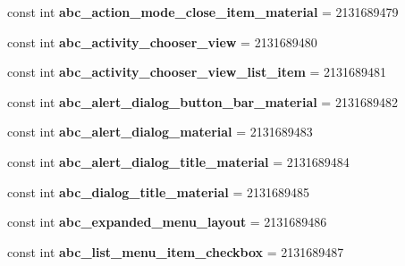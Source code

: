 \begin{DoxyCompactItemize}
const int {\bfseries abc\+\_\+action\+\_\+mode\+\_\+close\+\_\+item\+\_\+material} = 2131689479
\item 
\mbox{\label{classst_delivery_1_1_resource_1_1_layout_a719d6fa78de979f7c1c22ad79a291ed3}} 
const int {\bfseries abc\+\_\+activity\+\_\+chooser\+\_\+view} = 2131689480
\item 
\mbox{\label{classst_delivery_1_1_resource_1_1_layout_a82826934c1302d0ac2f0ffda5d973128}} 
const int {\bfseries abc\+\_\+activity\+\_\+chooser\+\_\+view\+\_\+list\+\_\+item} = 2131689481
\item 
\mbox{\label{classst_delivery_1_1_resource_1_1_layout_a0b042a434ed0ae2e3929a83f67098c23}} 
const int {\bfseries abc\+\_\+alert\+\_\+dialog\+\_\+button\+\_\+bar\+\_\+material} = 2131689482
\item 
\mbox{\label{classst_delivery_1_1_resource_1_1_layout_a9ad976eb9bf9a84b0694536d2665f1e1}} 
const int {\bfseries abc\+\_\+alert\+\_\+dialog\+\_\+material} = 2131689483
\item 
\mbox{\label{classst_delivery_1_1_resource_1_1_layout_a56db6d5ed81e6873ab817032eed0ac7c}} 
const int {\bfseries abc\+\_\+alert\+\_\+dialog\+\_\+title\+\_\+material} = 2131689484
\item 
\mbox{\label{classst_delivery_1_1_resource_1_1_layout_a522ea8a8d942b6a6ebd33abacb0fb6a8}} 
const int {\bfseries abc\+\_\+dialog\+\_\+title\+\_\+material} = 2131689485
\item 
\mbox{\label{classst_delivery_1_1_resource_1_1_layout_a731e1cb33f7cd26bd26a4f7ecad3049e}} 
const int {\bfseries abc\+\_\+expanded\+\_\+menu\+\_\+layout} = 2131689486
\item 
\mbox{\label{classst_delivery_1_1_resource_1_1_layout_a369a44b2587e1187606d74657ea6308a}} 
const int {\bfseries abc\+\_\+list\+\_\+menu\+\_\+item\+\_\+checkbox} = 2131689487
\item 

\end{DoxyCompactItemize}
